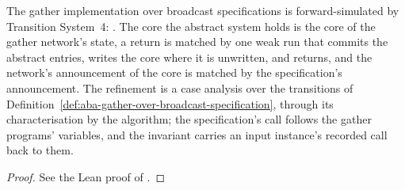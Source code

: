 \begin{theorem}
  \label{thm:gather-core}
  \leanok
  The gather implementation over broadcast specifications is forward-simulated by Transition System~4: .
  The core the abstract system holds is the core of the gather network's state, a return is matched by one weak run that commits the abstract entries, writes the core where it is unwritten, and returns, and the network's announcement of the core is matched by the specification's announcement.
  The refinement is a case analysis over the transitions of Definition~\ref{def:aba-gather-over-broadcast-specification}, through its characterisation by the algorithm; the specification's call follows the gather programs' variables, and the invariant carries an input instance's recorded call back to them.
\end{theorem}

\begin{proof}\leanok
  See the Lean proof of .
\end{proof}
